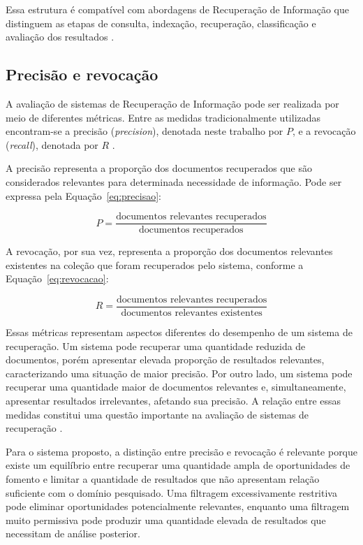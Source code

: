 Essa estrutura é compatível com abordagens de Recuperação de Informação que distinguem as etapas de consulta, indexação, recuperação, classificação e avaliação dos resultados \cite{baeza2011}.

\subsection{Precisão e revocação}

A avaliação de sistemas de Recuperação de Informação pode ser realizada por meio de diferentes métricas. Entre as medidas tradicionalmente utilizadas encontram-se a precisão (\textit{precision}), denotada neste trabalho por $P$, e a revocação (\textit{recall}), denotada por $R$ \cite{manning2008}.

A precisão representa a proporção dos documentos recuperados que são considerados relevantes para determinada necessidade de informação. Pode ser expressa pela Equação~\ref{eq:precisao}:

\begin{equation}
P =
\frac{\text{documentos relevantes recuperados}}
{\text{documentos recuperados}}
\label{eq:precisao}
\end{equation}

A revocação, por sua vez, representa a proporção dos documentos relevantes existentes na coleção que foram recuperados pelo sistema, conforme a Equação~\ref{eq:revocacao}:

\begin{equation}
R =
\frac{\text{documentos relevantes recuperados}}
{\text{documentos relevantes existentes}}
\label{eq:revocacao}
\end{equation}

Essas métricas representam aspectos diferentes do desempenho de um sistema de recuperação. Um sistema pode recuperar uma quantidade reduzida de documentos, porém apresentar elevada proporção de resultados relevantes, caracterizando uma situação de maior precisão. Por outro lado, um sistema pode recuperar uma quantidade maior de documentos relevantes e, simultaneamente, apresentar resultados irrelevantes, afetando sua precisão. A relação entre essas medidas constitui uma questão importante na avaliação de sistemas de recuperação \cite{manning2008}.

Para o sistema proposto, a distinção entre precisão e revocação é relevante porque existe um equilíbrio entre recuperar uma quantidade ampla de oportunidades de fomento e limitar a quantidade de resultados que não apresentam relação suficiente com o domínio pesquisado. Uma filtragem excessivamente restritiva pode eliminar oportunidades potencialmente relevantes, enquanto uma filtragem muito permissiva pode produzir uma quantidade elevada de resultados que necessitam de análise posterior.

